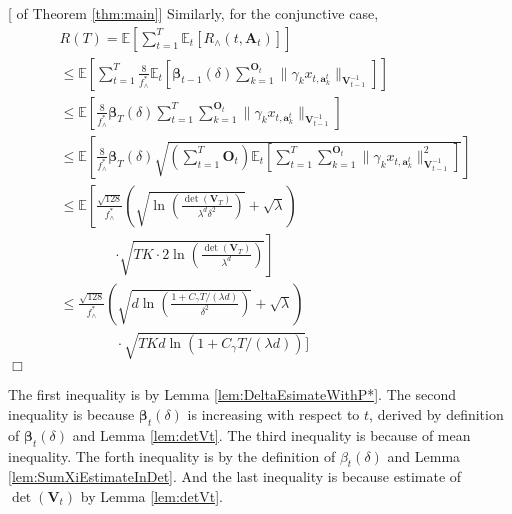 \documentclass{article}
\newcommand{\bbeta}{\boldsymbol{\beta}}
\newcommand{\EE}{\mathbb{E}}
\newcommand{\bA}{\mathbf{A}}
\newcommand{\ba}{\mathbf{a}}
\newcommand{\bO}{\mathbf{O}}
\newcommand{\bV}{\mathbf{V}}
\newcommand{\norm}[1]{\| #1 \|}
\newenvironment{proof}{\noindent {\textbf{Proof. }}}{$\Box$ \medskip}
\begin{document}
\begin{proof}[ of Theorem \ref{thm:main}]
Similarly, for the conjunctive case, 
\begin{equation}
\begin{split}
&R(T) = \EE[ \sum_{t=1}^{T} \EE_{t}[R_{\wedge}(t, \bA_t)] ]\\
&\leq \EE \left[\sum_{t=1}^{T} \frac{8}{f_{\wedge}^{\ast}} \EE_t\left[\bbeta_{t-1}(\delta)\sum_{k=1}^{\bO_t}\norm{\gamma_k x_{t,\ba_k^t}}_{\bV_{t-1}^{-1}} \right] \right] \\
&\leq \EE\left[\frac{8}{f_{\wedge}^{\ast}} \bbeta_{T}(\delta) \sum_{t=1}^{T} \sum_{k=1}^{\bO_t}\norm{\gamma_k x_{t,\ba_k^t}}_{\bV_{t-1}^{-1}} \right]\\
&\leq \EE\left[\frac{8}{f_{\wedge}^{\ast}} \bbeta_{T}(\delta) \sqrt{ \left(\sum_{t=1}^{T} \bO_t \right) \EE_t \left[\sum_{t=1}^{T} \sum_{k=1}^{\bO_t}\norm{\gamma_k x_{t,\ba_k^t}}_{\bV_{t-1}^{-1}}^2 \right]} \right]\\
&\leq \EE \left[\frac{\sqrt{128}}{f_{\wedge}^{\ast}} \left(\sqrt{\ln\left(\frac{\det(\bV_T)}{\lambda^d \delta^2}\right) } + \sqrt{\lambda} \right) \right. \\
&\qquad \qquad \left. \cdot \sqrt{TK \cdot 2\ln \left(\frac{\det(\bV_T)}{\lambda^d} \right)} \right]\\
&\leq \frac{\sqrt{128}}{f_{\wedge}^{\ast}} \left(\sqrt{d \ln \left( \frac{1 + C_\gamma T/(\lambda d)}{\delta^2}\right) } + \sqrt{\lambda} \right)\\
&\qquad \qquad \cdot \sqrt{TKd\ln(1 + C_\gamma T/(\lambda d))} ]
\end{split}
\end{equation}
\end{proof}

The first inequality is by Lemma \ref{lem:DeltaEsimateWithP*}. The second inequality is because $\bbeta_{t}(\delta)$ is increasing with respect to $t$, derived by definition of $\bbeta_t(\delta)$ and Lemma \ref{lem:detVt}. The third inequality is because of mean inequality. The forth inequality is by the definition of $\beta_t(\delta)$ and Lemma \ref{lem:SumXiEstimateInDet}. And the last inequality is because estimate of $\det(\bV_t)$ by Lemma \ref{lem:detVt}.
	
	


	
\end{document}
